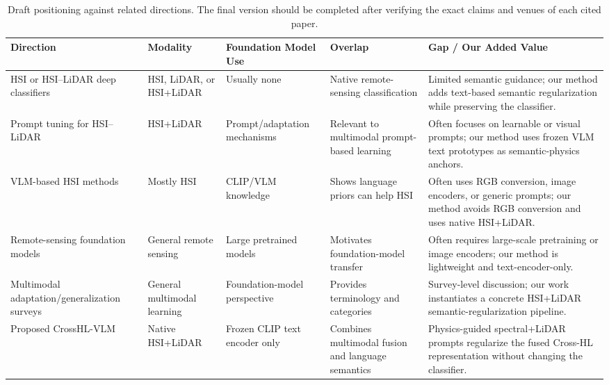 \documentclass[10pt,journal,compsoc]{IEEEtran}
\begin{document}
\begin{table}[t]
\centering
\caption{Draft positioning against related directions. The final version should be completed after verifying the exact claims and venues of each cited paper.}
\label{tab:positioning}
\begin{tabularx}{\textwidth}{p{2.6cm}p{2.2cm}p{2.2cm}p{2.3cm}X}
\toprule
\textbf{Direction} & \textbf{Modality} & \textbf{Foundation Model Use} & \textbf{Overlap} & \textbf{Gap / Our Added Value} \\
\midrule
HSI or HSI--LiDAR deep classifiers
& HSI, LiDAR, or HSI+LiDAR
& Usually none
& Native remote-sensing classification
& Limited semantic guidance; our method adds text-based semantic regularization while preserving the classifier. \\

\midrule
Prompt tuning for HSI--LiDAR
& HSI+LiDAR
& Prompt/adaptation mechanisms
& Relevant to multimodal prompt-based learning
& Often focuses on learnable or visual prompts; our method uses frozen VLM text prototypes as semantic-physics anchors. \\

\midrule
VLM-based HSI methods
& Mostly HSI
& CLIP/VLM knowledge
& Shows language priors can help HSI
& Often uses RGB conversion, image encoders, or generic prompts; our method avoids RGB conversion and uses native HSI+LiDAR. \\

\midrule
Remote-sensing foundation models
& General remote sensing
& Large pretrained models
& Motivates foundation-model transfer
& Often requires large-scale pretraining or image encoders; our method is lightweight and text-encoder-only. \\

\midrule
Multimodal adaptation/generalization surveys
& General multimodal learning
& Foundation-model perspective
& Provides terminology and categories
& Survey-level discussion; our work instantiates a concrete HSI+LiDAR semantic-regularization pipeline. \\

\midrule
\rowcolor{lightgray}
Proposed CrossHL-VLM
& Native HSI+LiDAR
& Frozen CLIP text encoder only
& Combines multimodal fusion and language semantics
& Physics-guided spectral+LiDAR prompts regularize the fused Cross-HL representation without changing the classifier. \\
\bottomrule
\end{tabularx}
\end{table}
\end{document}
